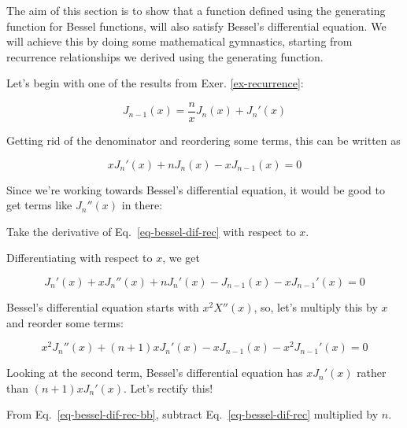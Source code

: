\pagebreak


The aim of this section is to show that a function defined using the generating function for Bessel functions, will also satisfy Bessel's differential equation. We will achieve this by doing some mathematical gymnastics, starting from recurrence relationships we derived using the generating function.

Let's begin with one of the results from Exer. \ref{ex-recurrence}:

\begin{equation}
J_{n-1}(x) = \frac{n}{x}J_n(x) + J_n'(x)
\end{equation}

Getting rid of the denominator and reordering some terms, this can be written as

\begin{equation}
x J_n'(x) + n J_n(x) - x J_{n-1}(x) = 0 \label{eq-bessel-dif-rec}
\end{equation} 

Since we're working towards Bessel's differential equation, it would be good to get terms like $J_n''(x)$ in there:

\begin{cue}
Take the derivative of Eq.~\ref{eq-bessel-dif-rec} with respect to $x$.
\end{cue}

Differentiating with respect to $x$, we get

\begin{equation}
J_n'(x) + x J_n''(x) + n J_n'(x) - J_{n-1}(x) - x J_{n-1}'(x)= 0
\end{equation} 

Bessel's differential equation starts with $x^2 X''(x)$, so, let's multiply this by $x$ and reorder some terms:

\begin{equation}
x^2 J_n''(x) + (n + 1) x J_n'(x) - x J_{n-1}(x) - x^2 J_{n-1}'(x)= 0 \label{eq-bessel-dif-rec-bb}
\end{equation} 

Looking at the second term, Bessel's differential equation has $x J_n'(x)$ rather than $(n + 1) x J_n'(x)$. Let's rectify this!

\begin{cue}
From Eq.~\ref{eq-bessel-dif-rec-bb}, subtract Eq.~\ref{eq-bessel-dif-rec} multiplied by $n$.
\end{cue}

